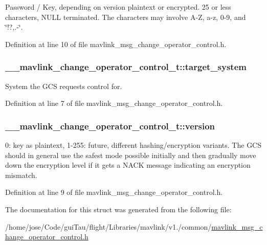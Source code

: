 Password / Key, depending on version plaintext or encrypted. 25 or less characters, N\-U\-L\-L terminated. The characters may involve A-\/\-Z, a-\/z, 0-\/9, and \char`\"{}!?,.-\/\char`\"{}. 



Definition at line 10 of file mavlink\-\_\-msg\-\_\-change\-\_\-operator\-\_\-control.\-h.

\hypertarget{struct____mavlink__change__operator__control__t_ac68f72fea3c066f00e0ccd0b978d119a}{
\subsubsection[{target\-\_\-system}]{ \-\_\-\-\_\-mavlink\-\_\-change\-\_\-operator\-\_\-control\-\_\-t\-::target\-\_\-system}}\label{struct____mavlink__change__operator__control__t_ac68f72fea3c066f00e0ccd0b978d119a}


System the G\-C\-S requests control for. 



Definition at line 7 of file mavlink\-\_\-msg\-\_\-change\-\_\-operator\-\_\-control.\-h.

\hypertarget{struct____mavlink__change__operator__control__t_a033ed1de1f96ee19a64572952e29da39}{
\subsubsection[{version}]{ \-\_\-\-\_\-mavlink\-\_\-change\-\_\-operator\-\_\-control\-\_\-t\-::version}}\label{struct____mavlink__change__operator__control__t_a033ed1de1f96ee19a64572952e29da39}


0\-: key as plaintext, 1-\/255\-: future, different hashing/encryption variants. The G\-C\-S should in general use the safest mode possible initially and then gradually move down the encryption level if it gets a N\-A\-C\-K message indicating an encryption mismatch. 



Definition at line 9 of file mavlink\-\_\-msg\-\_\-change\-\_\-operator\-\_\-control.\-h.



The documentation for this struct was generated from the following file\-:\begin{DoxyCompactItemize}
\item 
/home/jose/\-Code/gui\-Tau/flight/\-Libraries/mavlink/v1./common/\hyperlink{mavlink__msg__change__operator__control_8h}{mavlink\-\_\-msg\-\_\-change\-\_\-operator\-\_\-control.\-h}\end{DoxyCompactItemize}
